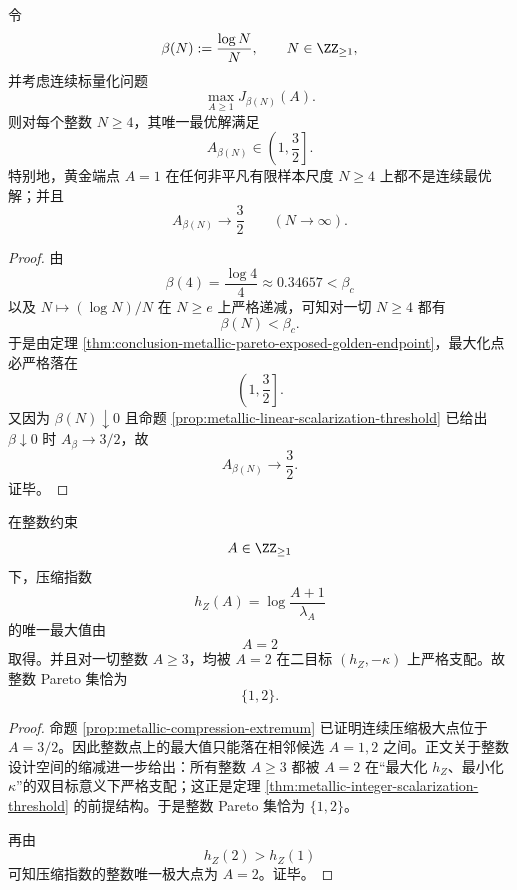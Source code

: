 \begin{theorem}[有限样本连续标量化的离黄金端点律]\label{thm:conclusion-metallic-finite-sample-antigolden}
令
\[
\beta(N):=\frac{\log N}{N},
\qquad
N\in\ZZ_{\ge 1},
\]
并考虑连续标量化问题
\[
\max_{A\ge 1}J_{\beta(N)}(A).
\]
则对每个整数 \(N\ge 4\)，其唯一最优解满足
\[
A_{\beta(N)}\in\left(1,\frac32\right].
\]
特别地，黄金端点 \(A=1\) 在任何非平凡有限样本尺度 \(N\ge 4\) 上都不是连续最优解；并且
\[
A_{\beta(N)}\longrightarrow \frac32
\qquad (N\to\infty).
\]
\end{theorem}
\begin{proof}
由
\[
\beta(4)=\frac{\log 4}{4}\approx 0.34657<\beta_c
\]
以及 \(N\mapsto (\log N)/N\) 在 \(N\ge e\) 上严格递减，可知对一切 \(N\ge 4\) 都有
\[
\beta(N)<\beta_c.
\]
于是由定理 \ref{thm:conclusion-metallic-pareto-exposed-golden-endpoint}，最大化点必严格落在
\[
\left(1,\frac32\right].
\]
又因为 \(\beta(N)\downarrow 0\) 且命题 \ref{prop:metallic-linear-scalarization-threshold} 已给出 \(\beta\downarrow 0\) 时 \(A_\beta\to 3/2\)，故
\[
A_{\beta(N)}\to \frac32.
\]
证毕。
\end{proof}


\begin{theorem}[整数设计空间的二值塌缩]\label{thm:conclusion-metallic-integer-binary-collapse}
在整数约束
\[
A\in\ZZ_{\ge 1}
\]
下，压缩指数
\[
h_Z(A)=\log\frac{A+1}{\lambda_A}
\]
的唯一最大值由
\[
A=2
\]
取得。并且对一切整数 \(A\ge 3\)，均被 \(A=2\) 在二目标 \((h_Z,-\kappa)\) 上严格支配。故整数 Pareto 集恰为
\[
\{1,2\}.
\]
\end{theorem}
\begin{proof}
命题 \ref{prop:metallic-compression-extremum} 已证明连续压缩极大点位于 \(A=3/2\)。因此整数点上的最大值只能落在相邻候选 \(A=1,2\) 之间。正文关于整数设计空间的缩减进一步给出：所有整数 \(A\ge 3\) 都被 \(A=2\) 在“最大化 \(h_Z\)、最小化 \(\kappa\)”的双目标意义下严格支配；这正是定理 \ref{thm:metallic-integer-scalarization-threshold} 的前提结构。于是整数 Pareto 集恰为 \(\{1,2\}\)。

再由
\[
h_Z(2)>h_Z(1)
\]
可知压缩指数的整数唯一极大点为 \(A=2\)。证毕。
\end{proof}
